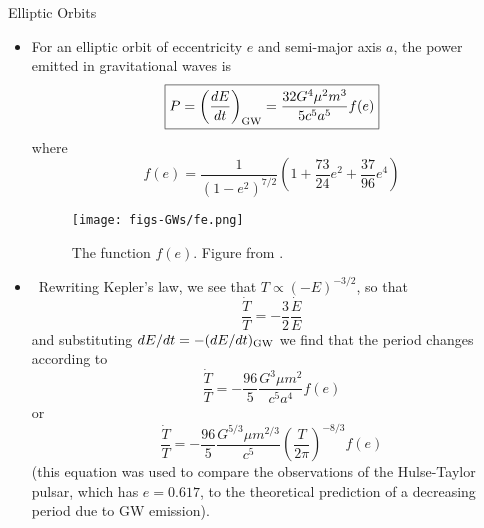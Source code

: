 \documentclass[size=11pt,style=paintings]{powerdot}
\begin{document}
 
  \begin{slide}{Elliptic Orbits}
 \begin{itemize}
 \item For an elliptic orbit of eccentricity $e$ and semi-major axis $a$, the power emitted in gravitational waves is
 $$ 
\boxed{P=\left(\frac{d E}{d t}\right)_{\rm GW} =\frac{32 G^{4} \mu^{2} m^{3}}{5 c^{5} a^{5}} f(e)}
$$
\vskip -0.4cm
where
\vskip -0.2cm
$$
f(e)=\frac{1}{\left(1-e^{2}\right)^{7 / 2}}\left(1+\frac{73}{24} e^{2}+\frac{37}{96} e^{4}\right)
$$
\vskip -0.4cm
\begin{figure}
  \centering
  \texttt{[image: figs-GWs/fe.png]}
  \caption{The function $f(e)$. Figure from \cite{2008-Maggiore}.}
\label{fig:polarization}
\end{figure}
 \end{itemize}
 \end{slide}
 
 

  \begin{slide}{}
 \begin{itemize}
 \item ~Rewriting Kepler's law, we see that $T\propto (-E)^{-3 / 2}$, so that
\begin{equation}
\frac{\dot{T}}{T}=-\frac{3}{2} \frac{\dot{E}}{E}
\end{equation}
and substituting $dE/dt = -(dE/dt)_{\rm GW}$ we find that the period changes according to
\begin{equation}
\frac{\dot{T}}{T}=-\frac{96}{5} \frac{G^{3} \mu m^{2}}{c^{5} a^{4}} f(e)
\end{equation}
or
\begin{equation}
\boxed{\frac{\dot{T}}{T}=-\frac{96}{5} \frac{G^{5 / 3} \mu m^{2 / 3}}{c^{5}}\left(\frac{T}{2 \pi}\right)^{-8 / 3} f(e)}
\end{equation}
(this equation was used to compare the observations of the Hulse-Taylor pulsar, which has $e=0.617$, to the theoretical prediction of a decreasing period due to GW emission). \end{itemize}
 \end{slide}
 
\end{document}
